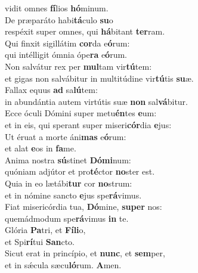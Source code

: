 \oddverse vidit omnes \textbf{fí}lios \textbf{hó}minum.\\
\evenverse De præparáto habi\textbf{tá}culo \textbf{su}o~\*\\
\evenverse respéxit super omnes, qui \textbf{há}bitant \textbf{ter}ram.\\
\oddverse Qui finxit sigillátim \textbf{cor}da e\textbf{ó}rum:~\*\\
\oddverse qui intélligit ómnia ópe\textbf{ra} e\textbf{ó}rum.\\
\evenverse Non salvátur rex per \textbf{mul}tam vir\textbf{tú}tem:~\*\\
\evenverse et gigas non salvábitur in multitúdine vir\textbf{tú}tis \textbf{su}æ.\\
\oddverse Fallax equus \textbf{ad} sa\textbf{lú}tem:~\*\\
\oddverse in abundántia autem virtútis suæ \textbf{non} sal\textbf{vá}bitur.\\
\evenverse Ecce óculi Dómini super metu\textbf{én}tes \textbf{e}um:~\*\\
\evenverse et in eis, qui sperant super miseri\textbf{cór}dia \textbf{e}jus:\\
\oddverse Ut éruat a morte áni\textbf{mas} e\textbf{ó}rum:~\*\\
\oddverse et alat \textbf{e}os in \textbf{fa}me.\\
\evenverse Anima nostra \textbf{sú}stinet \textbf{Dó}\textbf{mi}num:~\*\\
\evenverse quóniam adjútor et pro\textbf{té}ctor \textbf{no}ster est.\\
\oddverse Quia in eo lætábi\textbf{tur} cor \textbf{no}strum:~\*\\
\oddverse et in nómine sancto \textbf{e}jus spe\textbf{rá}vimus.\\
\evenverse Fiat misericórdia tua, \textbf{Dó}mine, \textbf{su}\textbf{per} nos:~\*\\
\evenverse quemádmodum spe\textbf{rá}vimus \textbf{in} te.\\
\oddverse Glória \textbf{Pa}tri, et \textbf{Fí}\textbf{li}o,~\*\\
\oddverse et Spi\textbf{rí}tui \textbf{San}cto.\\
\evenverse Sicut erat in princípio, et \textbf{nunc}, et \textbf{sem}per,~\*\\
\evenverse et in sǽcula sæcu\textbf{ló}rum. \textbf{A}men.\\
